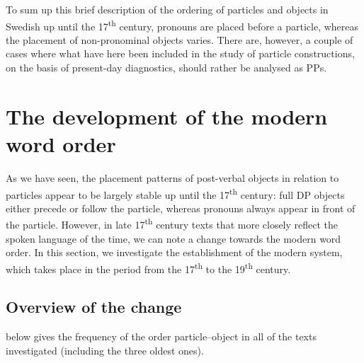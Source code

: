 \documentclass[output=paper]{langscibook}
\begin{document}
To sum up this brief description of the ordering of particles and objects in Swedish up until the 17\textsuperscript{th} century, pronouns are placed before a particle, whereas the placement of non-pronominal objects varies. There are, however, a couple of cases where what have here been included in the study of particle constructions, on the basis of present-day diagnostics, should rather be analysed as PPs. 


\section{The development of the modern word order}\label{sec:lalu:5}


As we have seen, the placement patterns of post-verbal objects in relation to particles appear to be largely stable up until the 17\textsuperscript{th} century: full DP objects either precede or follow the particle, whereas pronouns always appear in front of the particle. However, in late 17\textsuperscript{th} century texts that more closely reflect the spoken language of the time, we can note a change towards the modern word order. In this section, we investigate the establishment of the modern system, which takes place in the period from the 17\textsuperscript{th} to the 19\textsuperscript{th} century.


\subsection{Overview of the change}\label{sec:lalu:5.1}

 below gives the frequency of the order particle–object in all of the texts investigated (including the three oldest ones).
\end{document}
